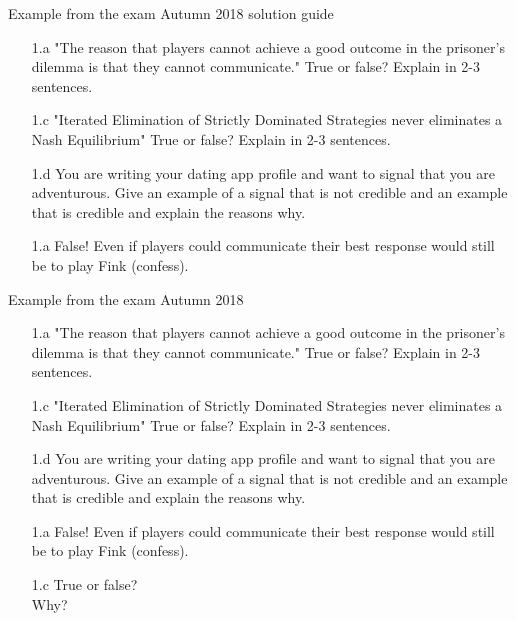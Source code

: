\begin{frame}{Example from the exam Autumn 2018 solution guide}
\begin{multicols}{2}\color{lightgray}
  \begin{itemize}
    \item[1.a] "The reason that players cannot achieve a good outcome in the prisoner’s dilemma is that they cannot communicate." True or false? Explain in 2-3 sentences.
    \color{lightgray}
    \item[\color{lightgray}1.c] "Iterated Elimination of Strictly Dominated Strategies never eliminates a Nash Equilibrium" True or false? Explain in 2-3 sentences.
    \item[\color{lightgray}1.d] You are writing your dating app profile and want to signal that you are adventurous. Give an example of a signal that is not credible and an example that is credible and explain the reasons why.
  \end{itemize}
\vfill\null \columnbreak
\begin{itemize}
  \item[1.a] False! Even if players could communicate their best response would still be to play Fink (confess).
\end{itemize}
\end{multicols}
\end{frame}

\begin{frame}{Example from the exam Autumn 2018}
\begin{multicols}{2}\color{lightgray}
  \begin{itemize}\color{lightgray}
    \item[\color{lightgray}1.a] "The reason that players cannot achieve a good outcome in the prisoner’s dilemma is that they cannot communicate." True or false? Explain in 2-3 sentences.
    \item[1.c] \color{black}"Iterated Elimination of Strictly Dominated Strategies never eliminates a Nash Equilibrium" True or false? Explain in 2-3 sentences.
    \item[\color{lightgray}1.d] \color{lightgray}You are writing your dating app profile and want to signal that you are adventurous. Give an example of a signal that is not credible and an example that is credible and explain the reasons why.
  \end{itemize}
\vfill\null \columnbreak
\begin{itemize}\color{lightgray}
  \item[\color{lightgray}1.a] False! Even if players could communicate their best response would still be to play Fink (confess).
  \item[1.c] \color{black} True or false? \\ Why?
\end{itemize}
\end{multicols}
\end{frame}

